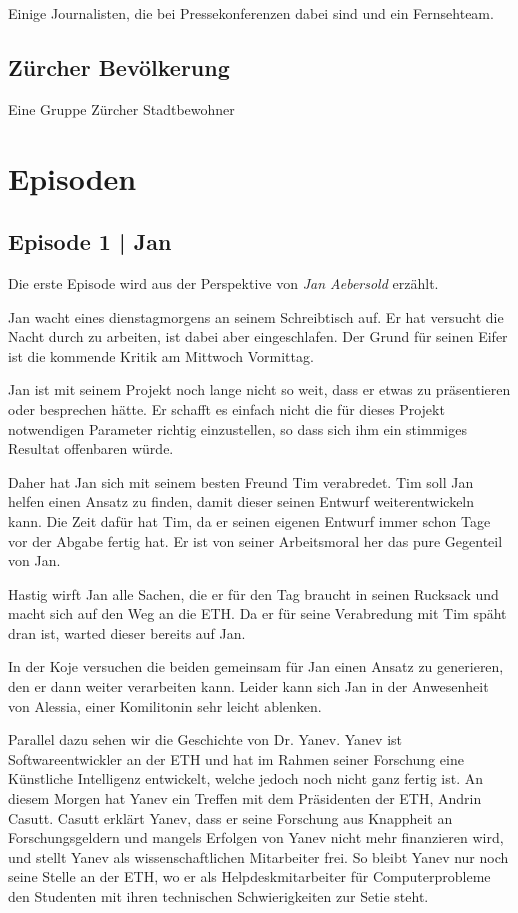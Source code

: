 \documentclass[11pt,a4paper,ngerman]{scrreprt}
\begin{document}
Einige Journalisten, die bei Pressekonferenzen dabei sind und ein Fernsehteam.

\section*{Zürcher Bevölkerung}

Eine Gruppe Zürcher Stadtbewohner

\chapter*{Episoden}

\section*{Episode 1 | Jan}

Die erste Episode wird aus der Perspektive von \emph{Jan Aebersold} erzählt.

Jan wacht eines dienstagmorgens an seinem Schreibtisch auf. Er hat versucht die
Nacht durch zu arbeiten, ist dabei aber eingeschlafen. Der Grund für seinen
Eifer ist die kommende Kritik am Mittwoch Vormittag.

Jan ist mit seinem Projekt noch lange nicht so weit, dass er etwas zu
präsentieren oder besprechen hätte. Er schafft es einfach nicht die für dieses
Projekt notwendigen Parameter richtig einzustellen, so dass sich ihm ein
stimmiges Resultat offenbaren würde.

Daher hat Jan sich mit seinem besten Freund Tim verabredet. Tim soll Jan helfen
einen Ansatz zu finden, damit dieser seinen Entwurf weiterentwickeln kann. Die
Zeit dafür hat Tim, da er seinen eigenen Entwurf immer schon Tage vor der Abgabe
fertig hat. Er ist von seiner Arbeitsmoral her das pure Gegenteil von Jan.

Hastig wirft Jan alle Sachen, die er für den Tag braucht in seinen Rucksack und
macht sich auf den Weg an die ETH. Da er für seine Verabredung mit Tim späht
dran ist, warted dieser bereits auf Jan.

In der Koje versuchen die beiden gemeinsam für Jan einen Ansatz zu generieren,
den er dann weiter verarbeiten kann. Leider kann sich Jan in der Anwesenheit von
Alessia, einer Komilitonin sehr leicht ablenken.

Parallel dazu sehen wir die Geschichte von Dr. Yanev. Yanev ist
Softwareentwickler an der ETH und hat im Rahmen seiner Forschung eine Künstliche
Intelligenz entwickelt, welche jedoch noch nicht ganz fertig ist. An diesem
Morgen hat Yanev ein Treffen mit dem Präsidenten der ETH, Andrin
Casutt. Casutt erklärt Yanev, dass er seine Forschung aus Knappheit an
Forschungsgeldern und mangels Erfolgen von Yanev nicht mehr finanzieren wird,
und stellt Yanev als wissenschaftlichen Mitarbeiter frei. So bleibt Yanev nur
noch seine Stelle an der ETH, wo er als Helpdeskmitarbeiter für Computerprobleme
den Studenten mit ihren technischen Schwierigkeiten zur Setie steht.
\end{document}
